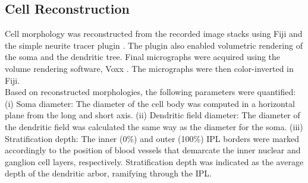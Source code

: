 \subsection{Cell Reconstruction}
Cell morphology was reconstructed from the recorded image stacks using Fiji \citep{cardona12} and the simple neurite tracer plugin \citep{longair11}. The plugin also enabled volumetric rendering of the soma and the dendritic tree. Final micrographs were acquired using the volume rendering software, Voxx \citep{clendenon02}. The micrographs were then color-inverted in Fiji. \\
Based on reconstructed morphologies, the following parameters were quantified: (i) Soma diameter: The diameter of the cell body was computed in a horizontal plane from the long and short axis. (ii) Dendritic field diameter: The diameter of the dendritic field was calculated the same way as the diameter for the soma. (iii) Stratification depth: The inner (0\%) and outer (100\%) IPL borders were marked accordingly to the position of blood vessels that demarcate the inner nuclear and ganglion cell layers, respectively. Stratification depth was indicated as the average depth of the dendritic arbor, ramifying through the IPL.





















